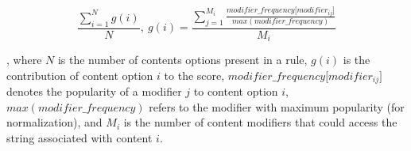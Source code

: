 \documentclass[sigconf,review, anonymous]{acmart}
\begin{document}
\[\frac{\sum_{i=1}^{N}g(i)}{N},~g(i)=\frac{\sum_{j=1}^{M_i}\frac{\mathit{modifier\_frequency[modifier_{ij}}]}{\mathit{max(modifier\_frequency)}}}{M_i}\]

\noindent
, where $N$ is the number of contents options present in a rule,
$g(i)$ is the contribution of content option $i$ to the score,
$\mathit{modifier\_frequency[modifier_{ij}}]$ denotes the popularity
of a modifier $j$ to content option $i$,
$\mathit{max(modifier\_frequency)}$ refers to the modifier with
maximum popularity (for normalization), and $M_i$ is the number of
content modifiers that could access the string associated with content
$i$.


                                                                             
\end{document}
